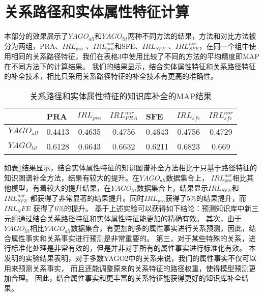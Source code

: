 \section{关系路径和实体属性特征计算}

\label{cha:exp-literal}
本部分的效果展示了$YAGO_{all}$和$YAGO_{lit}$两种不同方法的结果，方法和对比方法被分为两组，PRA、$IRL_{pra}$ 、$IRL_{pra}^{nor}$和SFE、$IRL_{SFE}$ 、$IRL_{SFE}^{nor}$，在同一个组中使用相同的关系路径特征，我们在表格3中使用比较了不同的方法的平均精度即MAP在不同方法下的计算结果。
我们的结果显示，结合实体属性特征和关系路径特征的补全技术，相比只采用关系路径特征的补全技术有更高的准确性。


\begin{table}[htbp]
  \centering
  \caption{关系路径和实体属性特征的知识库补全的MAP结果}
    \begin{tabular}{|l|c|c|c|c|c|c|}
    \hline
    \multicolumn{1}{|c|}{} & \multicolumn{1}{l|}{PRA} & \multicolumn{1}{l|}{$IRL_{pra}$} & \multicolumn{1}{l|}{$IRL_{PRA}^{nor}$} & \multicolumn{1}{l|}{SFE} & \multicolumn{1}{l|}{$IRL_{sfe}$} & \multicolumn{1}{l|}{$IRL_{sfe}^{nor}$} \\
    \hline
    $YAGO_{all}$ & 0.4413 & 0.4635 & 0.4756 & 0.4643 & 0.4756 & 0.4729 \\
    \hline
    $YAGO_{lit}$ & 0.6128 & 0.6643 & 0.6632 & 0.6211 & 0.6823 & 0.669 \\
    \hline
    \end{tabular}%
  \label{tab:addlabel}%
\end{table}%


如表\ref{tab:addlabel}结果显示，结合实体属性特征的知识图谱补全方法相比于只基于路径特征的知识图谱补全方法，结果有较大的提升。在$YAGO_{all}$数据集合上，
$IRL_{pra}^{nor}$相比其他模型，有着较大的提升结果，在$YAGO_{lit}$数据集合上，结果显示$IRL_{SFE}$和$IRL_{SFE}^{nor}$ 都获得了非常显著的结果提升。同时$IRL_{pra}$获得了5\%的结果提升，而$IRL_SFE$ 获得了6\%的提升。
基于上述实验可以获得如下结论：预测知识库中新三元组通过结合关系路径特征和实体属性特征能更加的精确有效。
其次，由于$YAGO_{lit}$相比$YAGO_{all}$数据集合，有更加的多的属性事实进行关系预测，因此，结合属性事实和关系事实进行预测是非常重要的。
第三，对于某些特殊的关系，进行标准化处理是非常有效的，但是并非对于所有的属性事实进行标准化有效。
本发明的实验结果表明，对于多数YAGO2中的关系来说，我们的属性事实不仅可以用来预测关系事实，
而且还能调整原来的关系特征的路径权重，使得模型预测更加合理。
因此，结合属性事实和更丰富的关系特征能获得更好的知识库补全结果。

